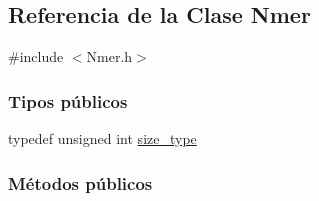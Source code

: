\hypertarget{classNmer}{}\subsection{Referencia de la Clase Nmer}
\label{classNmer}


{\ttfamily \#include $<$Nmer.\+h$>$}

\subsubsection*{Tipos públicos}
\begin{DoxyCompactItemize}
\item 
typedef unsigned int \hyperlink{classNmer_a1b8892df885de3ac91edf3abd8f1b55d}{size\+\_\+type}
\end{DoxyCompactItemize}
\subsubsection*{Métodos públicos}
